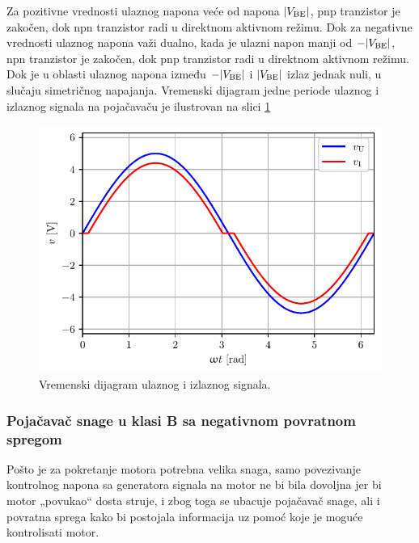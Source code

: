 \documentclass[a4paper, 12pt, diplomski]{etf}
\newcommand{\navod}[1]{„#1“}
\begin{document}
Za pozitivne vrednosti ulaznog napona veće od napona $|V_{\rm B \rm E}|$, pnp tranzistor je zakočen, dok npn tranzistor radi u direktnom aktivnom režimu. Dok za negativne vrednosti ulaznog napona važi dualno, kada je ulazni napon manji od $-|V_{\rm B \rm E}|$, npn tranzistor je zakočen, dok pnp tranzistor radi u direktnom aktivnom režimu. Dok je u oblasti ulaznog napona između $-|V_{\rm B \rm E}|$ i $|V_{\rm B \rm E}|$ izlaz jednak nuli, u slučaju simetričnog napajanja. Vremenski dijagram jedne periode ulaznog i izlaznog signala na pojačavaču je ilustrovan na slici \ref{vremenskiPAb}


\begin{figure}[!h]
    \centering
    \includegraphics[scale=1]{fig_teorija/crossover.pdf}
    \caption{Vremenski dijagram ulaznog i izlaznog signala.}
    \label{vremenskiPAb}
\end{figure}


\break

\subsubsection{Pojačavač snage u klasi B sa negativnom povratnom spregom} \label{s:PAB}

Pošto je za pokretanje motora potrebna velika snaga, samo povezivanje kontrolnog napona sa generatora signala na motor ne bi bila dovoljna jer bi motor \navod{povukao} dosta struje, i zbog toga se ubacuje pojačavač snage, ali i povratna sprega kako bi postojala informacija uz pomoć koje je moguće kontrolisati motor. 
\end{document}
